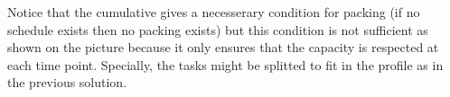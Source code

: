 
Notice that the cumulative gives a necesserary condition for packing (if no schedule exists then no packing exists) but this condition is not sufficient as shown on the picture because it only ensures that the capacity is respected at each time point. Specially, the tasks might be splitted to fit in the profile as in the previous solution.
